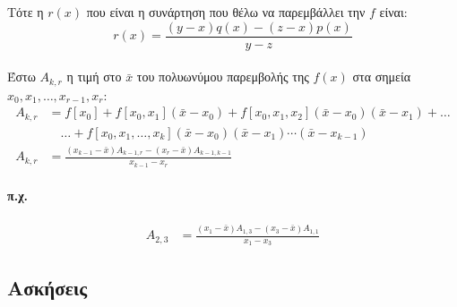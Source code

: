 \documentclass[11pt,a4paper,notitlepage,fleqn]{article}
\begin{document}
 	Τότε η \( r(x) \) που είναι η συνάρτηση που θέλω να
 	παρεμβάλλει την \( f \) είναι:
 	\[
 	\boxed{
 	r(x) = \frac{(y-x)q(x) - (z-x)p(x)}{y-z}
    }
 	\]
 	
 	\paragraph{}
 	Έστω \( A_{k,r} \) η τιμή στο \( \bar x \) του πολυωνύμου
 	παρεμβολής της \( f(x) \) στα σημεία \( x_0,x_1,
 	\dots,x_{r-1},x_r \):
 	\begin{align*}
 	A_{k,r} &= f[x_0] + f[x_0,x_1](\bar x-x_0)
 	+ f[x_0,x_1,x_2](\bar x-x_0)(\bar x-x_1) + \dots
 	\\ &\quad \dots + f[x_0,x_1,\dots,x_k](\bar x-x_0)
 	(\bar x-x_1)\cdots(\bar x-x_{k-1}) \\
 	A_{k,r} &= \frac{(x_{k-1}-\bar x)A_{k-1,r}
 		-(x_r-\bar x)A_{k-1,k-1}}{x_{k-1}-x_r}
	\end{align*}
	
	
	
	
	\paragraph{π.χ.}
	\begin{align*}
		A_{2,3} &=
		\frac{(x_1-\bar x)A_{1,3}-(x_3-\bar x)A_{1,1}}{x_1-x_3}
	\end{align*}
	
	\subsection{Ασκήσεις}
\end{document}
